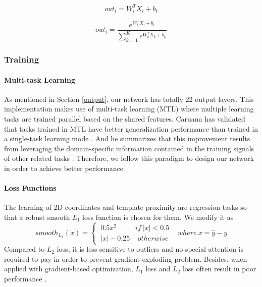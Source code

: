 \begin{equation}
\label{linear}
out_i = W_i^TX_i+b_i
\end{equation}

\begin{equation}
\label{softmax}
out_i = \frac{e^{W_i^TX_i+b_i}}{\sum_{k=1}^K e^{W_k^TX_k+b_k}}
\end{equation}


\subsubsection{Training}

\paragraph{Multi-task Learning}
As mentioned in Section \ref{output}, our network has totally 22 output layers. This implementation makes use of multi-task learning (MTL) where multiple learning tasks are trained parallel based on the shared features. Caruana has validated that tasks trained in MTL have better generalization performance than trained in a single-task learning mode \cite{Caruana1997}. And he summarizes that this improvement results from leveraging the domain-specific information contained in the training signals of other related tasks \cite{Caruana1997}. Therefore, we follow this paradigm to design our network in order to achieve better performance.

\paragraph{Loss Functions}
The learning of 2D coordinates and template proximity are regression tasks so that a robust smooth $L_1$ loss function \cite{DBLP:journals/corr/Girshick15} is chosen for them. We modify it as
\begin{equation}
\label{eq10}
smooth_{L_1}(x) =
\begin{cases}
~0.5x^2 ~~~~~~~~~~~~if ~\left | x \right |< 0.5 & \\    
~\left | x \right | -0.25 ~~~~~otherwise   
\end{cases} 
where  ~ x=\widehat{y} - y
\end{equation}
Compared to $L_2$ loss, it is less sensitive to outliers and no special attention is required to pay in order to prevent gradient exploding problem\cite{DBLP:journals/corr/Girshick15}. Besides, when applied with gradient-based optimization, $L_1$ loss and $L_2$ loss often result in poor performance \cite{Goodfellow-et-al-2016}.

